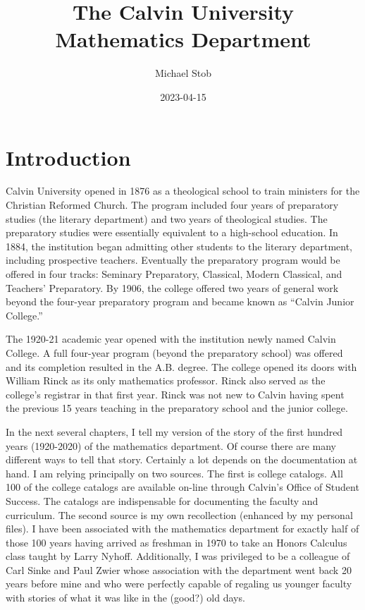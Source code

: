 \documentclass[
]{book}
\title{The Calvin University Mathematics Department}
\author{Michael Stob}
\date{2023-04-15}
\begin{document}
\maketitle

{
\setcounter{tocdepth}{1}
\tableofcontents
}
\hypertarget{introduction}{%
\chapter{Introduction}\label{introduction}}

Calvin University opened in 1876 as a theological school to train ministers for the Christian Reformed Church. The program included four years of preparatory studies (the literary department) and two years of theological studies. The preparatory studies were essentially equivalent to a high-school education. In 1884, the institution began admitting other students to the literary department, including prospective teachers. Eventually the preparatory program would be offered in four tracks: Seminary Preparatory, Classical, Modern Classical, and Teachers' Preparatory. By 1906, the college offered two years of general work beyond the four-year preparatory program and became known as ``Calvin Junior College.''

The 1920-21 academic year opened with the institution newly named Calvin College. A full four-year program (beyond the preparatory school) was offered and its completion resulted in the A.B. degree. The college opened its doors with William Rinck as its only mathematics professor. Rinck also served as the college's registrar in that first year. Rinck was not new to Calvin having spent the previous 15 years teaching in the preparatory school and the junior college.

In the next several chapters, I tell my version of the story of the first hundred years (1920-2020) of the mathematics department. Of course there are many different ways to tell that story. Certainly a lot depends on the documentation at hand. I am relying principally on two sources. The first is college catalogs. All 100 of the college catalogs are available on-line through Calvin's Office of Student Success. The catalogs are indispensable for documenting the faculty and curriculum. The second source is my own recollection (enhanced by my personal files). I have been associated with the mathematics department for exactly half of those 100 years having arrived as freshman in 1970 to take an Honors Calculus class taught by Larry Nyhoff. Additionally, I was privileged to be a colleague of Carl Sinke and Paul Zwier whose association with the department went back 20 years before mine and who were perfectly capable of regaling us younger faculty with stories of what it was like in the (good?) old days.
\end{document}
